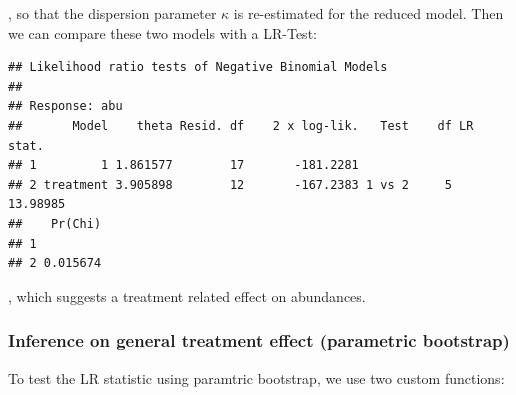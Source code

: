 , so that the dispersion parameter $\kappa$ is re-estimated for the reduced model.
Then we can compare these two models with a LR-Test:
\begin{knitrout}
\color{fgcolor}\begin{kframe}
\begin{alltt}
  \hlstd{=} \hlstd{)}
\end{alltt}
\begin{verbatim}
## Likelihood ratio tests of Negative Binomial Models
## 
## Response: abu
##       Model    theta Resid. df    2 x log-lik.   Test    df LR stat.
## 1         1 1.861577        17       -181.2281                      
## 2 treatment 3.905898        12       -167.2383 1 vs 2     5 13.98985
##    Pr(Chi)
## 1         
## 2 0.015674
\end{verbatim}
\end{kframe}
\end{knitrout}
, which suggests a treatment related effect on abundances.


\subsubsection{Inference on general treatment effect (parametric bootstrap)}

To test the LR statistic using paramtric bootstrap, we use two custom functions:

